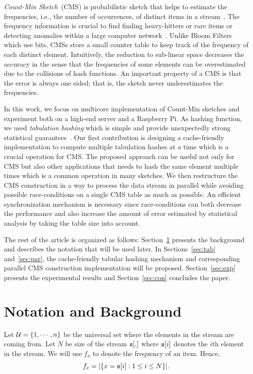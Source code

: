 \documentclass[10pt, conference, compsocconf]{IEEEtran}
\begin{document}
{\it Count-Min Sketch}~(CMS) is probabilistic sketch that helps to estimate the frequencies, i.e., the number of occurrences, of distinct items in a stream~\cite{cormode2005}. The frequency  information is crucial to find finding heavy-hitters or rare items or detecting anomalies within a large computer network~\cite{cormode2003, cormode2005}. Unlike Bloom Filters which use bits, CMSs store a small counter table to keep track of the frequency of each distinct element. Intuitively, the reduction to sub-linear space decreases the accuracy in the sense that the frequencies of some elements can be overestimated due to the collisions of hash functions. An important property of a CMS is that the error is always one sided; that is, the sketch never underestimates the frequencies. 

In this work, we focus on multicore implementation of Count-Min sketches and experiment both on a high-end server and a Raspberry Pi. As hashing function, we used {\em tabulation hashing} which is simple and provide unexpectedly strong statistical guarantees~\cite{patrascu2012,thorup2017}. Our first contribution is designing a cache-friendly implementation to compute multiple tabulation hashes at a time which is a crucial operation for CMS. The proposed approach can be useful not only for CMS but also other applications that needs to hash the same element multiple times which is a common operation in many sketches. We then restructure the CMS construction in a way to process the data stream in parallel while avoiding possible race-conditions on a single CMS table as much as possible. An efficient synchronization mechanism is necessary since race-conditions can both decrease the performance and also increase the amount of error estimated by statistical analysis by taking the table size into account. 

The  rest of the article is organized as follows: Section~\ref{sec:not} presents the background and describes the notation that will be used later. In Sections~\ref{sec:tab} and~\ref{sec:par}, the cache-friendly tabular hashing mechanism and corresponding parallel CMS construction implementation will be proposed. Section~\ref{sec:exp} presents the experimental results and Section~\ref{sec:con} concludes the paper.
   
 \section{Notation and Background}\label{sec:not}

Let ${\cal U} = \{1,\cdots,n\}$ be the universal set where the elements in the stream are coming from. 
Let $N$ be size of the stream ${\tt s}[.]$ where ${\tt s}[i]$ denotes the $i$th element in the stream.
We will use $f_x$ to denote the frequency of an item. Hence, $$f_x = |\{x = {\tt s}[i]: 1 \leq i \leq N\}|.$$
\end{document}
